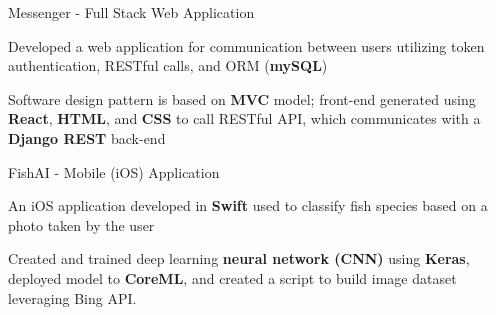 \begin{siderulesProj}
\par\addvspace{-1.2ex}
\begin{cventriesproject}
  \cventryproject
    {Messenger - Full Stack Web Application}
    {
      \begin{cvskillitems}
        \item { Developed a web application for communication between users utilizing token authentication, RESTful calls, and ORM (\textbf{mySQL})}
        \item {Software design pattern is based on \textbf{MVC} model; front-end generated using \textbf{React}, \textbf{HTML}, and \textbf{CSS} to call RESTful API, which communicates with a \textbf{Django REST} back-end}
      \end{cvskillitems}
    }
  \cventryproject
    {FishAI - Mobile (iOS) Application}
    {
      \begin{cvskillitems}
        \item {An iOS application developed in \textbf{Swift} used to classify fish species based on a photo taken by the user}
        \item {Created and trained deep learning \textbf{neural network (CNN)} using \textbf{Keras}, deployed model to \textbf{CoreML}, and created a script to build image dataset leveraging Bing API.}
      \end{cvskillitems}
    }
\end{cventriesproject}
\end{siderulesProj}

